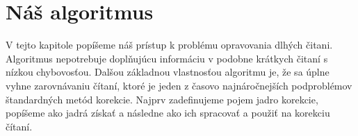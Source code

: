 \chapter{Náš algoritmus}

V tejto kapitole popíšeme náš prístup k problému opravovania dlhých čitani. Algoritmus nepotrebuje doplňujúcu informáciu v podobne krátkych čitaní s nízkou chybovosťou. Dalšou základnou vlastnosťou algoritmu je, že sa úplne vyhne zarovnávaniu čítaní, ktoré je jeden z časovo najnáročnejších podproblémov štandardných metód korekcie. Najprv zadefinujeme pojem jadro korekcie, popíšeme ako jadrá získať a následne ako ich spracovať a použiť na korekciu čítaní.





